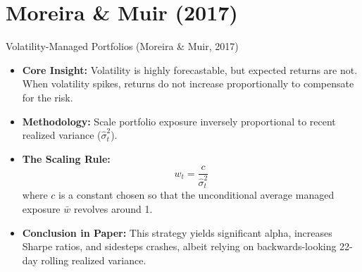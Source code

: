 \documentclass[10pt]{beamer}\usepackage[]{graphicx}\usepackage[table]{xcolor}
\begin{document}
\section{Moreira \& Muir (2017)}
\begin{frame}{Volatility-Managed Portfolios (Moreira \& Muir, 2017)}

  \begin{itemize}
    \setlength\itemsep{1.0em}
    \item \textbf{Core Insight:} Volatility is highly forecastable, but expected returns are not. When volatility spikes, returns do not increase proportionally to compensate for the risk.
    \item \textbf{Methodology:} Scale portfolio exposure inversely proportional to recent realized variance ($\hat{\sigma}^2_t$).
    \item \textbf{The Scaling Rule:} 
      \[
        w_t = \frac{c}{\hat{\sigma}^2_t}
      \]
      where $c$ is a constant chosen so that the unconditional average managed exposure $\bar{w}$ revolves around 1.
    \item \textbf{Conclusion in Paper:} This strategy yields significant alpha, increases Sharpe ratios, and sidesteps crashes, albeit relying on backwards-looking 22-day rolling realized variance.
  \end{itemize}

\end{frame}

\end{document}
